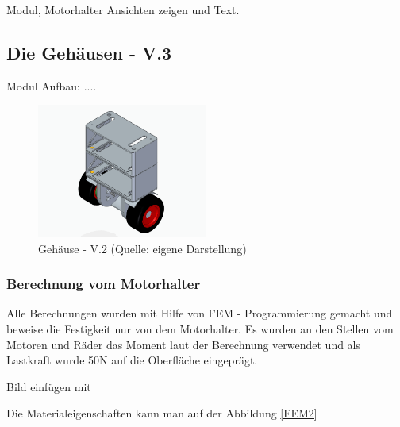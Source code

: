 Modul, Motorhalter Ansichten zeigen und Text.
\renewcommand{\autoren}{Valentyn Chepil}
\newpage

\subsection{Die Gehäusen - V.3}

Modul Aufbau: ....


\begin{figure}[!h]  %
	\centering\includegraphics[width=0.5\textwidth]{images/gehaeuse-v3.png}
	\caption{Gehäuse - V.2 \newline (Quelle: eigene Darstellung)}
	\label{gehaeuse-v3} %
\end{figure}

\subsubsection{ Berechnung vom Motorhalter}

Alle Berechnungen wurden mit Hilfe von FEM - Programmierung gemacht und beweise die Festigkeit nur von dem Motorhalter. Es wurden an den Stellen vom Motoren und Räder das Moment laut der Berechnung %
 verwendet und als Lastkraft wurde 50N auf die Oberfläche eingeprägt.

Bild einfügen mit %

Die Materialeigenschaften kann man auf der Abbildung \ref{FEM2}

